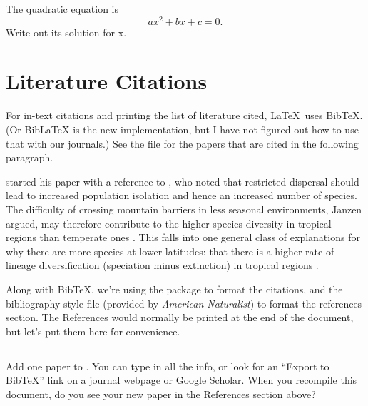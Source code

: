 \documentclass{article}
\begin{document}
The quadratic equation is
\begin{equation}
    a x^2 + b x + c = 0.
\label{eq:quadratic}
\end{equation}
Write out its solution for x.

\section{Literature Citations}
\label{sec:literature}

For in-text citations and printing the list of literature cited, \LaTeX\ uses BibTeX.
(Or BibLaTeX is the new implementation, but I have not figured out how to use that with our journals.)
See the  file for the papers that are cited in the following paragraph.

\citet{Janzen1967} started his paper with a reference to \citet{Simpson1964}, who noted that restricted dispersal should lead to increased population isolation and hence an increased number of species.
The difficulty of crossing mountain barriers in less seasonal environments, Janzen argued, may therefore contribute to the higher species diversity in tropical regions than temperate ones \citep{Ghalambor2006}.
This falls into one general class of explanations for why there are more species at lower latitudes: that there is a higher rate of lineage diversification (speciation minus extinction) in tropical regions               \citep{Ricklefs2006, Weir2007, Mittelbach2007}.

Along with BibTeX, we're using the package  to format the citations, and the bibliography style file  (provided by \emph{American Naturalist}) to format the references section.
The References would normally be printed at the end of the document, but let's put them here for convenience.


\subsection*{\task}

Add one paper to .
You can type in all the info, or look for an ``Export to BibTeX'' link on a journal webpage or Google Scholar.
When you recompile this document, do you see your new paper in the References section above?
\end{document}
